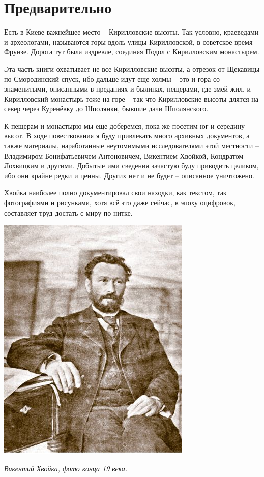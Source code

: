 \chapter{Предварительно}

Есть в Киеве важнейшее место – Кирилловские высоты. Так условно, краеведами и археологами, называются горы вдоль улицы Кирилловской, в советское время Фрунзе. Дорога тут была издревле, соединяя Подол с Кирилловским монастырем.

Эта часть книги охватывает не все Кирилловские высоты, а отрезок от Щекавицы по Смородинский спуск, ибо дальше идут еще холмы – это и гора со знаменитыми, описанными в преданиях и былинах, пещерами, где змей жил, и Кирилловский монастырь тоже на горе – так что Кирилловские высоты длятся на север через Куренёвку до Шполянки, бывшие дачи Шполянского.

К пещерам и монастырю мы еще доберемся, пока же посетим юг и середину высот. В ходе повествования я буду привлекать много архивных документов, а также материалы, наработанные неутомимыми исследователями этой местности – Владимиром Бонифатьевичем Антоновичем, Викентием Хвойкой, Кондратом Лохвицким и другими. Добытые ими сведения зачастую буду приводить целиком, ибо они крайне редки и ценны. Других нет и не будет – описанное уничтожено.

Хвойка наиболее полно документировал свои находки, как текстом, так фотографиями и рисунками, хотя всё это даже сейчас, в эпоху оцифровок, составляет труд достать с миру по нитке.

\begin{center}
\includegraphics[width=0.68\linewidth]{chast-kirvys/predvaritelno/hvoyka-9x.png}

\textit{Викентий Хвойка, фото конца 19 века.}
\end{center}

